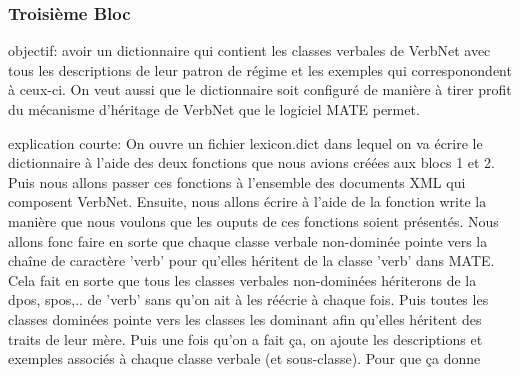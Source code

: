 \subsubsection{Troisième Bloc}

objectif: avoir un dictionnaire qui contient les classes verbales de VerbNet avec tous les descriptions de leur patron de régime  et les exemples qui corresponondent à ceux-ci. On veut aussi que le dictionnaire soit configuré de manière à tirer profit du mécanisme d'héritage de VerbNet que le logiciel MATE permet.

explication courte: On ouvre un fichier lexicon.dict dans lequel on va écrire le dictionnaire à l'aide des deux fonctions que nous avions créées aux blocs 1 et 2. Puis nous allons passer ces fonctions à l'ensemble des documents XML qui composent VerbNet. Ensuite, nous allons écrire à l'aide de la fonction write la manière que nous voulons que les ouputs de ces fonctions soient présentés. Nous allons fonc faire en sorte que chaque classe verbale non-dominée pointe vers la chaîne de caractère 'verb' pour qu'elles héritent de la classe 'verb' dans MATE. Cela fait en sorte que tous les classes verbales non-dominées hériterons de la dpos, spos,.. de 'verb' sans qu'on ait à les réécrie à chaque fois. Puis toutes les classes dominées pointe vers les classes les dominant afin qu'elles héritent des traits de leur mère. Puis une fois qu'on a fait ça, on ajoute les descriptions et exemples associés à chaque classe verbale (et sous-classe). Pour que ça donne 

